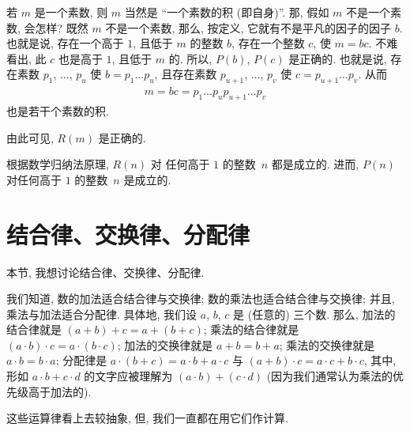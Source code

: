 \documentclass[%
    UTF8,%
    fontset=none,%
    punct=kaiming,%
    zihao=-4,%
    a4paper,%
    oneside,%
]{ctexbook}
\begin{document}
\begin{example}
    若 \(m\) 是一个素数,
    则 \(m\) 当然是 ``一个素数的积 (即自身)''.
    那, 假如 \(m\) 不是一个素数, 会怎样?
    既然 \(m\) 不是一个素数,
    那么, 按定义, 它就有不是平凡的因子的因子 \(b\).
    也就是说, 存在一个高于 \(1\), 且低于 \(m\) 的整数 \(b\),
    存在一个整数 \(c\),
    使 \(m = bc\).
    不难看出,
    此 \(c\) 也是高于 \(1\), 且低于 \(m\) 的.
    所以, \(P(b)\), \(P(c)\) 是正确的.
    也就是说, 存在素数
    \(p_1\), \(\dots\), \(p_u\)
    使 \(b = p_1 \dots p_u\),
    且存在素数
    \(p_{u+1}\), \(\dots\), \(p_v\)
    使 \(c = p_{u+1} \dots p_v\).
    从而
    \begin{align*}
        m = bc = p_1 \dots p_u p_{u+1} \dots p_v
    \end{align*}
    也是若干个素数的积.

    由此可见, \(R(m)\) 是正确的.

    根据数学归纳法原理, \(R(n)\) 对%
    任何高于 \(1\) 的整数~\(n\) 都是成立的.
    进而, \(P(n)\) 对任何高于 \(1\) 的整数~\(n\) 是成立的.
\end{example}

\section{结合律、交换律、分配律}

本节, 我想讨论结合律、交换律、分配律.

我们知道, 数的加法适合结合律与交换律;
数的乘法也适合结合律与交换律;
并且, 乘法与加法适合分配律.
具体地, 我们设 \(a\), \(b\), \(c\) 是 (任意的) 三个数.
那么, 加法的结合律就是 \((a + b) + c = a + (b + c)\);
乘法的结合律就是 \((a \cdot b) \cdot c = a \cdot (b \cdot c)\);
加法的交换律就是 \(a + b = b + a\);
乘法的交换律就是 \(a \cdot b = b \cdot a\);
分配律是
\(a \cdot (b + c) = a \cdot b + a \cdot c\)
与
\((a + b) \cdot c = a \cdot c + b \cdot c\),
其中, 形如 \(a \cdot b + c \cdot d\)
的文字应被理解为
\((a \cdot b) + (c \cdot d)\)
(因为我们通常认为乘法的优先级高于加法的).

这些运算律看上去较抽象,
但, 我们一直都在用它们作计算.
\end{document}
